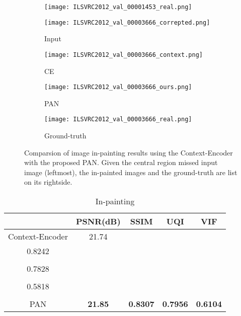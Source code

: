 \documentclass{article}
\begin{document}
\begin{figure}[!t]
\begin{subfigure}[b]{0.22\textwidth}
    \label{fig_first_case}
\end{subfigure}
 \begin{subfigure}[b]{0.22\textwidth}
    \texttt{[image: ILSVRC2012\_val\_00001453\_real.png]}%
    \label{fig_first_case}
\end{subfigure}
 \begin{subfigure}[b]{0.22\textwidth}
    \texttt{[image: ILSVRC2012\_val\_00003666\_correpted.png]}
    \caption{Input}    
    \label{fig_first_case}
\end{subfigure}
 \begin{subfigure}[b]{0.22\textwidth}
    \texttt{[image: ILSVRC2012\_val\_00003666\_context.png]}
    \caption{CE}
    \label{fig_first_case}
\end{subfigure}
 \begin{subfigure}[b]{0.22\textwidth}
    \texttt{[image: ILSVRC2012\_val\_00003666\_ours.png]}
    \caption{PAN}
    \label{fig_first_case}
\end{subfigure}
 \begin{subfigure}[b]{0.22\textwidth}
    \texttt{[image: ILSVRC2012\_val\_00003666\_real.png]}
    \caption{Ground-truth}
    \label{fig_first_case}
\end{subfigure}
\caption{Comparsion of image in-painting results using the Context-Encoder with the proposed PAN. Given the central region missed input image (leftmost), the in-painted images and the ground-truth are list on its rightside.}
\label{fig_sim}
\end{figure}

\begin{table}[!t]
\renewcommand{\arraystretch}{1.5}
\caption{In-painting}
\label{table:inpainting}
\centering
\begin{tabular}{|c|c|c|c|c|}
\hline
  & PSNR(dB) & SSIM  & UQI & VIF\\
\hline
\hline
 Context-Encoder &  21.74  & \\ 0.8242 \\ & \\0.7828 \\ & \\0.5818 \\ \\
\hline
 PAN & {\bf 21.85} & {\bf 0.8307} & {\bf 0.7956} & {\bf 0.6104} \\
\hline
\end{tabular}
\end{table}
\end{document}
